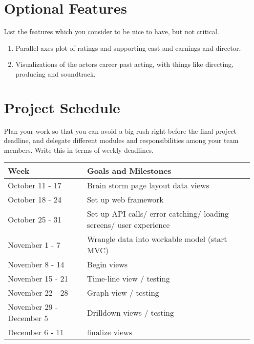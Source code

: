 \documentclass[12pt]{article}
\begin{document}
\section{Optional Features}
List the features which you consider to be nice to have, but not critical.
\begin{enumerate}
 
 \item Parallel axes plot of ratings and supporting cast and earnings and director. 

 \item Visualizations of the actors career past acting, with things like directing, producing and soundtrack. 

\end{enumerate}
 
\section{Project Schedule}
Plan your work so that you can avoid a big rush right before the final project deadline, and delegate different modules and responsibilities among your team members. Write this in terms of weekly deadlines.
\begin{center}
    \begin{tabular}{l l}
        \hline
        \textbf{Week} & \textbf{Goals and Milestones}\\
        \hline
        October 11 - 17				& Brain storm page layout data views \\
        October 18 - 24				& Set up web framework \\
        October 25 - 31				& Set up API calls/ error catching/ loading screens/ user experience \\
        November 1 - 7				& Wrangle data into workable model (start MVC) \\
        November 8 - 14 			& Begin views \\
        November 15 - 21			& Time-line view / testing \\
        November 22 - 28			& Graph view / testing	\\
        November 29 - December 5	& Drilldown views / testing \\
        December 6 - 11 			& finalize views \\
    \end{tabular}
\end{center}
\end{document}
